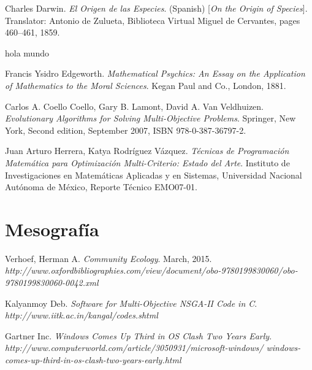 \documentclass[class=report, crop=false]{standalone}
\begin{document}

\begin{thebibliography}{15}

Charles Darwin. \textit{El Origen de las Especies}. (Spanish) [\textit{On 
the Origin of Species}]. Translator: Antonio de Zulueta, Biblioteca Virtual 
Miguel de Cervantes, pages 460–461, 1859.

hola mundo

Francis Ysidro Edgeworth. \textit{Mathematical Psychics: An Essay on the 
Application of Mathematics to the Moral Sciences}. Kegan Paul and Co., 
London, 1881.

Carlos A. Coello Coello, Gary B. Lamont, David A. Van Veldhuizen. \textit{Evolutionary 
Algorithms for Solving Multi-Objective Problems}. Springer, New York, 
Second edition, September 2007, ISBN 978-0-387-36797-2.

Juan Arturo Herrera, Katya Rodríguez Vázquez. \textit{Técnicas de Programación 
Matemática para Optimización Multi-Criterio: Estado del Arte}. Instituto de 
Investigaciones en Matemáticas Aplicadas y en Sistemas, Universidad Nacional 
Autónoma de México, Reporte Técnico EMO07-01.

\section{Mesografía}

Verhoef, Herman A. \textit{Community Ecology}. March, 2015.\break
\textit{http://www.oxfordbibliographies.com/view/document/obo-9780199830060/obo-9780199830060-0042.xml}

Kalyanmoy Deb. \textit{Software for Multi-Objective NSGA-II Code in C}.\break
\textit{http://www.iitk.ac.in/kangal/codes.shtml}

Gartner Inc. \textit{Windows Comes Up Third in OS Clash Two Years Early}.
\textit{http://www.computerworld.com/article/3050931/microsoft-windows/
windows-comes-up-third-in-os-clash-two-years-early.html}

\end{thebibliography}

\end{document}
